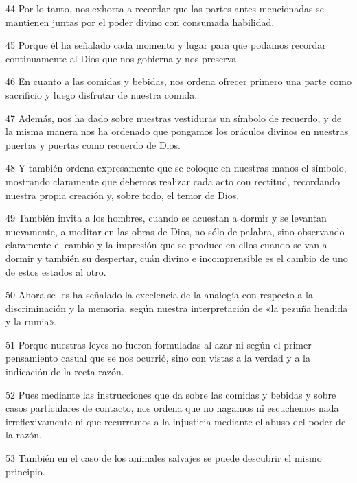 \par 44 Por lo tanto, nos exhorta a recordar que las partes antes mencionadas se mantienen juntas por el poder divino con consumada habilidad.

\par 45 Porque él ha señalado cada momento y lugar para que podamos recordar continuamente al Dios que nos gobierna y nos preserva.

\par 46 En cuanto a las comidas y bebidas, nos ordena ofrecer primero una parte como sacrificio y luego disfrutar de nuestra comida.

\par 47 Además, nos ha dado sobre nuestras vestiduras un símbolo de recuerdo, y de la misma manera nos ha ordenado que pongamos los oráculos divinos en nuestras puertas y puertas como recuerdo de Dios.

\par 48 Y también ordena expresamente que se coloque en nuestras manos el símbolo, mostrando claramente que debemos realizar cada acto con rectitud, recordando nuestra propia creación y, sobre todo, el temor de Dios.

\par 49 También invita a los hombres, cuando se acuestan a dormir y se levantan nuevamente, a meditar en las obras de Dios, no sólo de palabra, sino observando claramente el cambio y la impresión que se produce en ellos cuando se van a dormir y también su despertar, cuán divino e incomprensible es el cambio de uno de estos estados al otro.

\par 50 Ahora se les ha señalado la excelencia de la analogía con respecto a la discriminación y la memoria, según nuestra interpretación de «la pezuña hendida y la rumia».

\par 51 Porque nuestras leyes no fueron formuladas al azar ni según el primer pensamiento casual que se nos ocurrió, sino con vistas a la verdad y a la indicación de la recta razón.

\par 52 Pues mediante las instrucciones que da sobre las comidas y bebidas y sobre casos particulares de contacto, nos ordena que no hagamos ni escuchemos nada irreflexivamente ni que recurramos a la injusticia mediante el abuso del poder de la razón.

\par 53 También en el caso de los animales salvajes se puede descubrir el mismo principio.

